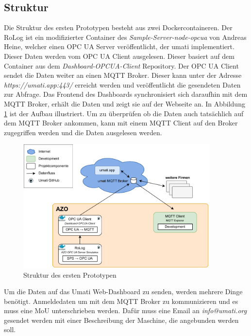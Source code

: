 \documentclass[a4paper, 12pt, oneside, toc=listofnumbered, bibliography=totoc]{scrbook}
\begin{document}
		\subsection{Struktur}
		
		Die Struktur des ersten Prototypen besteht aus zwei Dockercontaineren. Der RoLog ist ein modifizierter Container des \textit{Sample-Server-node-opcua} von Andreas Heine, welcher einen OPC UA Server veröffentlicht, der umati implementiert. Dieser Daten werden vom OPC UA Client ausgelesen. Dieser basiert auf dem Container aus dem \textit{Dashboard-OPCUA-Client} Repository. Der OPC UA Client sendet die Daten weiter an einen MQTT Broker. Dieser kann unter der Adresse \textit{https://umati.app:443/} erreicht werden und veröffentlicht die gesendeten Daten zur Abfrage. Das Frontend des Dashboards synchronisiert sich daraufhin mit dem MQTT Broker, erhält die Daten und zeigt sie auf der Webseite an. In Abbildung \ref{fig:Prototyp1} ist der Aufbau illustriert. Um zu überprüfen ob die Daten auch tatsächlich auf dem MQTT Broker ankommen, kann mit einem MQTT Client auf den Broker zugegriffen werden und die Daten ausgelesen werden.
		
		\begin{figure}[H]
			\centering
			\includegraphics[width=0.9\textwidth]{res/implementierung/Prototyp-umatiWeb.pdf}
			\caption{Struktur des ersten Prototypen}
			\label{fig:Prototyp1}
		\end{figure}
		
		Um die Daten auf das Umati Web-Dashboard zu senden, werden mehrere Dinge benötigt. Anmeldedaten um mit dem MQTT Broker zu kommunizieren und es muss eine \ac{MoU} unterschrieben werden. Dafür muss eine Email an \textit{info@umati.org} gesendet werden mit einer Beschreibung der Maschine, die angebunden werden soll. 
		
\end{document}
